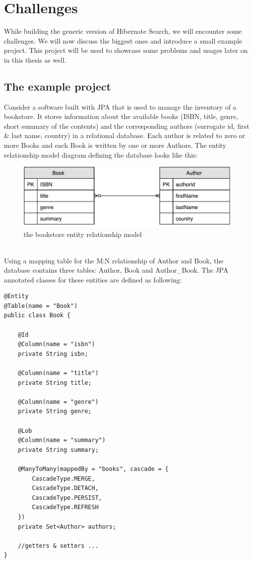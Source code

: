 \section{Challenges}\label{Challenges}
While building the generic version of Hibernate Search, we will encounter some challenges. We will now discuss the biggest ones and introduce a small example project. This project will be used to showcase some problems and usages later on in this thesis as well.

\subsection{The example project}
Consider a software built with JPA that is used to manage the inventory of a bookstore. It stores information about the available books (ISBN, title, genre, short summary of the contents) and the corresponding authors (surrogate id, first \& last name, country) in a relational database. Each author is related to zero or more Books and each Book is written by one or more Authors. The entity relationship model diagram defining the database looks like this:
\\
\begin{figure}[ht]
	\centering
	\includegraphics[scale = 0.9]{images/Sample_Project_ER.pdf}
	\caption{the bookstore entity relationship model}
	\label{fig3}
\end{figure}
\\
Using a mapping table for the M:N relationship of Author and Book, the database contains three tables: Author, Book and Author\_Book. The JPA annotated classes for these entities are defined as following:
\\
\lstset{language=java}
\begin{lstlisting}[frame=htrbl, caption={Book.java}, label={lst:book.java_1}]
@Entity
@Table(name = "Book")
public class Book {

	@Id
	@Column(name = "isbn")
	private String isbn;
	
	@Column(name = "title")
	private String title;
	
	@Column(name = "genre")
	private String genre;
	
	@Lob
	@Column(name = "summary")
	private String summary;
	
	@ManyToMany(mappedBy = "books", cascade = {
		CascadeType.MERGE,
		CascadeType.DETACH,
		CascadeType.PERSIST,
		CascadeType.REFRESH
	})
	private Set<Author> authors;
	
	//getters & setters ...
}
\end{lstlisting}

